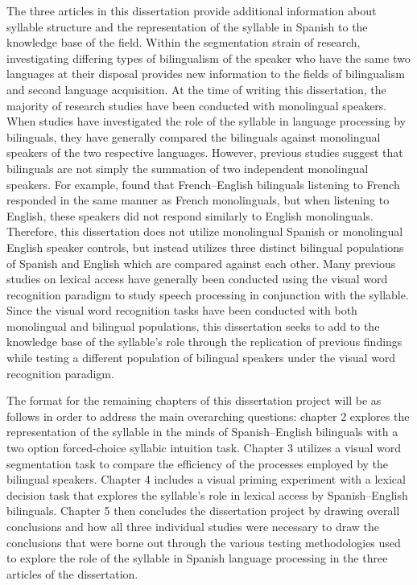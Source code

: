 \documentclass[
12pt, %
english, %
doublespacing, %
nolistspacing, %
liststotoc, %
headsepline, %
chapterinoneline, %
openany, %
]{DoctoralThesis}\usepackage[]{graphicx}\usepackage[]{color}
\begin{document}
The three articles in this dissertation provide additional information about syllable structure and the representation of the syllable in Spanish to the knowledge base of the field. Within the segmentation strain of research, investigating differing types of bilingualism of the speaker who have the same two languages at their disposal provides new information to the fields of bilingualism and second language acquisition. At the time of writing this dissertation, the majority of research studies have been conducted with monolingual speakers. When studies have investigated the role of the syllable in language processing by bilinguals, they have generally compared the bilinguals against monolingual speakers of the two respective languages. However, previous studies suggest that bilinguals are not simply the summation of two independent monolingual speakers. For example, %
found that French--English bilinguals listening to French responded in the same manner as French monolinguals, but when listening to English, these speakers did not respond similarly to English monolinguals. Therefore, this dissertation does not utilize monolingual Spanish or monolingual English speaker controls, but instead utilizes three distinct bilingual populations of Spanish and English which are compared against each other. %
Many previous studies on lexical access have generally been conducted using the visual word recognition paradigm to study speech processing in conjunction with the syllable. Since the visual word recognition tasks have been conducted with both monolingual and bilingual populations, this dissertation seeks to add to the knowledge base of the syllable’s role through the replication of previous findings while testing a different population of bilingual speakers under the visual word recognition paradigm.

The format for the remaining chapters of this dissertation project will be as follows in order to address the main overarching questions: chapter 2 explores the representation of the syllable in the minds of Spanish–English bilinguals with a two option forced-choice syllabic intuition task. Chapter 3 utilizes a visual word segmentation task to compare the efficiency of the processes employed by the bilingual speakers. Chapter 4 includes a visual priming experiment with a lexical decision task that explores the syllable’s role in lexical access by Spanish–English bilinguals. Chapter 5 then concludes the dissertation project by drawing overall conclusions and how all three individual studies were necessary to draw the conclusions that were borne out through the various testing methodologies used to explore the role of the syllable in Spanish language processing in the three articles of the dissertation.
\end{document}
